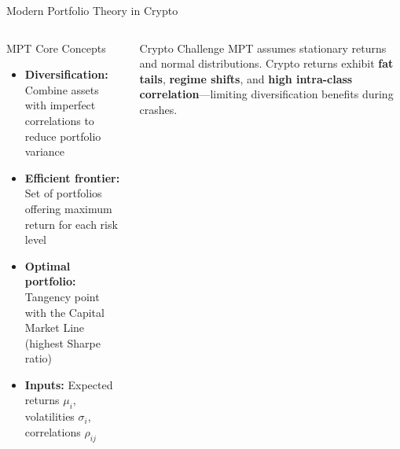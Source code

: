 \documentclass[8pt,aspectratio=169]{beamer}
\begin{document}
\begin{frame}{Modern Portfolio Theory in Crypto}
\begin{columns}[T]
\begin{block}{MPT Core Concepts}
\begin{itemize}\setlength{\itemsep}{2pt}
  \item \textbf{Diversification:} Combine assets with imperfect correlations to reduce portfolio variance
  \item \textbf{Efficient frontier:} Set of portfolios offering maximum return for each risk level
  \item \textbf{Optimal portfolio:} Tangency point with the Capital Market Line (highest Sharpe ratio)
  \item \textbf{Inputs:} Expected returns $\mu_i$, volatilities $\sigma_i$, correlations $\rho_{ij}$
\end{itemize}
\end{block}
\vspace{1mm}
\begin{alertblock}{Crypto Challenge}
\scriptsize MPT assumes stationary returns and normal distributions. Crypto returns exhibit \textbf{fat tails}, \textbf{regime shifts}, and \textbf{high intra-class correlation}---limiting diversification benefits during crashes.
\end{alertblock}
\end{columns}
\end{frame}
\end{document}
